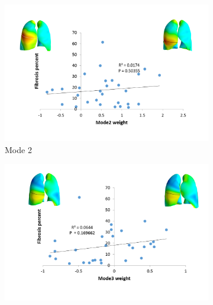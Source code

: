 \begin{figure}[H]
\begin{subfigure}{.72\linewidth}
  \includegraphics[width=\linewidth,trim={{.0\wd0} {.0\wd0} {.0\wd0} {.0\wd0}},clip]{QuantitativeAnalysis/Image/Mode2AgainstFibrosis.png}
  \caption{Mode 2}
  \label{fig:ShapeVSFibrosis-b}
\end{subfigure}
\begin{subfigure}{.72\linewidth}%
  \includegraphics[width=\linewidth,trim={{.0\wd0} {.0\wd0} {.0\wd0} {.0\wd0}},clip]{QuantitativeAnalysis/Image/Mode3AgainstFibrosis.png}

\end{subfigure}
\end{figure}
